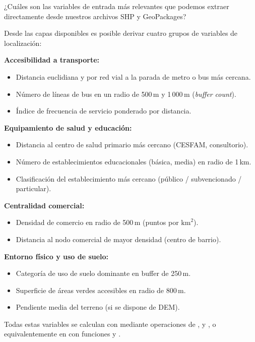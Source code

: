 \documentclass[12pt, letterpaper]{article}
\begin{document}
\begin{usermsg}
¿Cuáles son las variables de entrada más relevantes que podemos extraer directamente desde
nuestros archivos SHP y GeoPackages?
\end{usermsg}

\begin{aimsg}
Desde las capas disponibles es posible derivar cuatro grupos de variables de localización:

\medskip
\textbf{Accesibilidad a transporte:}
\begin{itemize}
  \item Distancia euclidiana y por red vial a la parada de metro o bus más cercana.
  \item Número de líneas de bus en un radio de 500\,m y 1\,000\,m (\textit{buffer count}).
  \item Índice de frecuencia de servicio ponderado por distancia.
\end{itemize}

\textbf{Equipamiento de salud y educación:}
\begin{itemize}
  \item Distancia al centro de salud primario más cercano (CESFAM, consultorio).
  \item Número de establecimientos educacionales (básica, media) en radio de 1\,km.
  \item Clasificación del establecimiento más cercano (público / subvencionado / particular).
\end{itemize}

\textbf{Centralidad comercial:}
\begin{itemize}
  \item Densidad de comercio en radio de 500\,m (puntos por $\text{km}^2$).
  \item Distancia al nodo comercial de mayor densidad (centro de barrio).
\end{itemize}

\textbf{Entorno físico y uso de suelo:}
\begin{itemize}
  \item Categoría de uso de suelo dominante en buffer de 250\,m.
  \item Superficie de áreas verdes accesibles en radio de 800\,m.
  \item Pendiente media del terreno (si se dispone de DEM).
\end{itemize}

\medskip
Todas estas variables se calculan con  mediante operaciones de
,  y , o equivalentemente en
 con funciones  y .
\end{aimsg}
\end{document}
